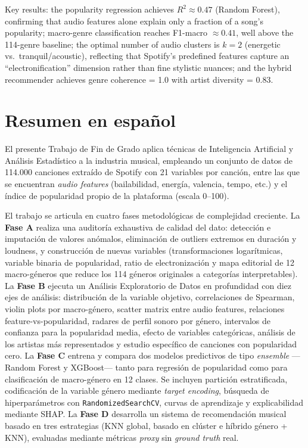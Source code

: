 \documentclass[12pt, a4paper, twoside]{book}
\theoremstyle{definition}
\begin{document}
Key results: the popularity regression achieves $R^2 \approx 0.47$ (Random
Forest), confirming that audio features alone explain only a fraction of a song's
popularity; macro-genre classification reaches F1-macro $\approx 0.41$, well above
the 114-genre baseline; the optimal number of audio clusters is $k = 2$
(energetic vs.\ tranquil/acoustic), reflecting that Spotify's predefined features
capture an ``electronification'' dimension rather than fine stylistic nuances; and the
hybrid recommender achieves genre coherence = 1.0 with artist diversity = 0.83.

\cleardoublepage

\chapter*{Resumen en español}

El presente Trabajo de Fin de Grado aplica técnicas de Inteligencia Artificial y
Análisis Estadístico a la industria musical, empleando un conjunto de datos de
114.000 canciones extraído de Spotify con 21 variables por canción, entre las que
se encuentran \textit{audio features} (bailabilidad, energía, valencia, tempo, etc.)
y el índice de popularidad propio de la plataforma (escala 0--100).

El trabajo se articula en cuatro fases metodológicas de complejidad creciente.
La \textbf{Fase A} realiza una auditoría exhaustiva de calidad del dato: detección
e imputación de valores anómalos, eliminación de outliers extremos en duración y
loudness, y construcción de nuevas variables (transformaciones logarítmicas, variable
binaria de popularidad, ratio de electronización y mapa editorial de 12 macro-géneros
que reduce los 114 géneros originales a categorías interpretables).
La \textbf{Fase B} ejecuta un Análisis Exploratorio de Datos en profundidad con diez
ejes de análisis: distribución de la variable objetivo, correlaciones de Spearman,
violin plots por macro-género, scatter matrix entre audio features, relaciones
feature-vs-popularidad, radares de perfil sonoro por género, intervalos de confianza
para la popularidad media, efecto de variables categóricas, análisis de los artistas
más representados y estudio específico de canciones con popularidad cero.
La \textbf{Fase C} entrena y compara dos modelos predictivos de tipo \textit{ensemble}
---Random Forest y XGBoost--- tanto para regresión de popularidad como para
clasificación de macro-género en 12 clases. Se incluyen partición estratificada,
codificación de la variable género mediante \textit{target encoding}, búsqueda de
hiperparámetros con \texttt{RandomizedSearchCV}, curvas de aprendizaje y
explicabilidad mediante SHAP.
La \textbf{Fase D} desarrolla un sistema de recomendación musical basado en tres
estrategias (KNN global, basado en clúster e híbrido género + KNN), evaluadas
mediante métricas \textit{proxy} sin \textit{ground truth} real.
\end{document}
